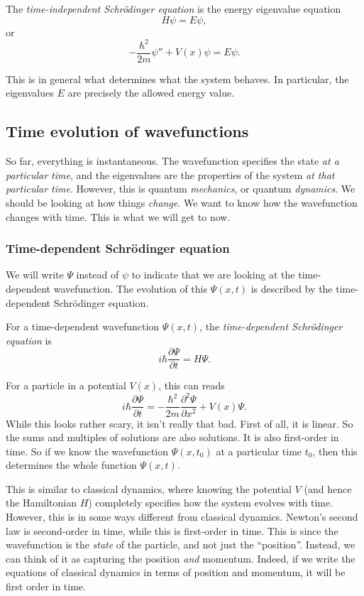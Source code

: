 \documentclass[a4paper]{article}
\begin{document}
\begin{defi}
  The \emph{time-independent Schr\"odinger equation} is the energy eigenvalue equation
  \[
    H\psi = E\psi,
  \]
  or
  \[
    -\frac{\hbar^2}{2m}\psi'' + V(x) \psi = E\psi.
  \]
\end{defi}
This is in general what determines what the system behaves. In particular, the eigenvalues $E$ are precisely the allowed energy value.

\subsection{Time evolution of wavefunctions}
So far, everything is instantaneous. The wavefunction specifies the state \emph{at a particular time}, and the eigenvalues are the properties of the system \emph{at that particular time}. However, this is quantum \emph{mechanics}, or quantum \emph{dynamics}. We should be looking at how things \emph{change}. We want to know how the wavefunction changes with time. This is what we will get to now.

\subsubsection{Time-dependent Schr\"odinger equation}
We will write $\Psi$ instead of $\psi$ to indicate that we are looking at the time-dependent wavefunction. The evolution of this $\Psi(x, t)$ is described by the time-dependent Schr\"odinger equation.
\begin{defi}
  For a time-dependent wavefunction $\Psi(x, t)$, the \emph{time-dependent Schr\"odinger equation} is
  \[
    i\hbar \frac{\partial \Psi}{\partial t} = H\Psi.\tag{*}
  \]
\end{defi}
For a particle in a potential $V(x)$, this can reads
\[
  i\hbar \frac{\partial \Psi}{\partial t} = -\frac{\hbar^2}{2m}\frac{\partial^2 \Psi}{\partial x^2} + V(x) \Psi.
\]
While this looks rather scary, it isn't really that bad. First of all, it is linear. So the sums and multiples of solutions are also solutions. It is also first-order in time. So if we know the wavefunction $\Psi(x, t_0)$ at a particular time $t_0$, then this determines the whole function $\Psi(x, t)$.

This is similar to classical dynamics, where knowing the potential $V$ (and hence the Hamiltonian $H$) completely specifies how the system evolves with time. However, this is in some ways different from classical dynamics. Newton's second law is second-order in time, while this is first-order in time. This is since the wavefunction is the \emph{state} of the particle, and not just the ``position''. Instead, we can think of it as capturing the position \emph{and} momentum. Indeed, if we write the equations of classical dynamics in terms of position and momentum, it will be first order in time.
\end{document}
